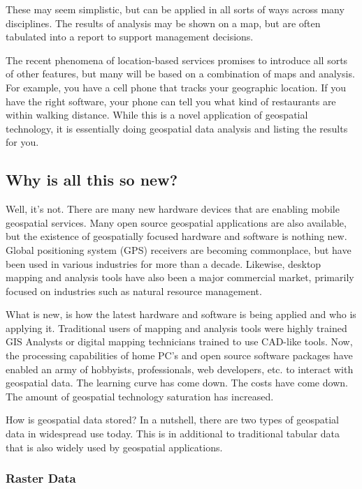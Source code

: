 These may seem simplistic, but can be applied in all sorts of ways across
many disciplines. The results of analysis may be shown on a map, but are
often tabulated into a report to support management decisions.

The recent phenomena of location-based services promises to introduce all
sorts of other features, but many will be based on a combination of maps
and analysis. For example, you have a cell phone that tracks your
geographic location. If you have the right software, your phone can tell
you what kind of restaurants are within walking distance. While this is a
novel application of geospatial technology, it is essentially doing
geospatial data analysis and listing the results for you.

\subsection{Why is all this so new?}\label{label_whynew}

Well, it's not. There are many new hardware devices that are enabling
mobile geospatial services. Many open source geospatial applications are
also available, but the existence of geospatially focused hardware and
software is nothing new. Global positioning system (GPS) receivers are
becoming commonplace, but have been used in various industries for more
than a decade. Likewise, desktop mapping and analysis tools have also been
a major commercial market, primarily focused on industries such as natural
resource management.

What is new, is how the latest hardware and software is being applied and
who is applying it. Traditional users of mapping and analysis tools were
highly trained GIS Analysts or digital mapping technicians trained to use
CAD-like tools. Now, the processing capabilities of home PC's and open
source software packages have enabled an army of hobbyists, professionals,
web developers, etc. to interact with geospatial data. The learning curve
has come down. The costs have come down. The amount of geospatial
technology saturation has increased.

How is geospatial data stored? In a nutshell, there are two types of
geospatial data in widespread use today. This is in additional to
traditional tabular data that is also widely used by geospatial
applications.

\subsubsection{Raster Data}\label{label_rasterdata}

